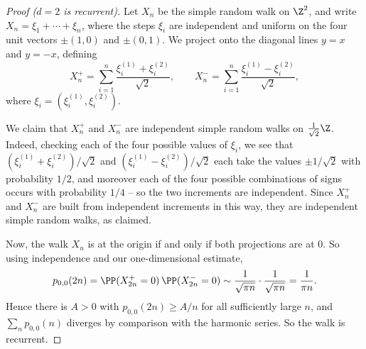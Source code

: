 \documentclass[a4paper]{scrartcl}
\begin{document}
\begin{center}
\end{center}

\begin{proof}[Proof ($d = 2$ is recurrent)]
	Let $X_n$ be the simple random walk on $\Z^2$, and write $X_n = \xi_1 + \cdots + \xi_n$, where the steps $\xi_i$ are independent and uniform on the four unit vectors $\pm(1, 0)$ and $\pm(0, 1)$. We project onto the diagonal lines $y = x$ and $y = -x$, defining
	$$
	X_n^+ = \sum_{i = 1}^{n} \frac{\xi_i^{(1)} + \xi_i^{(2)}}{\sqrt{2}}, \qquad X_n^- = \sum_{i = 1}^{n} \frac{\xi_i^{(1)} - \xi_i^{(2)}}{\sqrt{2}},
	$$
	where $\xi_i = (\xi_i^{(1)}, \xi_i^{(2)})$.

	We claim that $X_n^+$ and $X_n^-$ are independent simple random walks on $\frac{1}{\sqrt{2}}\Z$. Indeed, checking each of the four possible values of $\xi_i$, we see that $(\xi_i^{(1)} + \xi_i^{(2)})/\sqrt{2}$ and $(\xi_i^{(1)} - \xi_i^{(2)})/\sqrt{2}$ each take the values $\pm 1/\sqrt{2}$ with probability $1/2$, and moreover each of the four possible combinations of signs occurs with probability $1/4$ -- so the two increments are independent. Since $X_n^+$ and $X_n^-$ are built from independent increments in this way, they are independent simple random walks, as claimed.

	Now, the walk $X_n$ is at the origin if and only if both projections are at 0. So using independence and our one-dimensional estimate,
	$$
	p_{0, 0}(2n) = \PP(X_{2n}^+ = 0)\,\PP(X_{2n}^- = 0) \sim \frac{1}{\sqrt{\pi n}} \cdot \frac{1}{\sqrt{\pi n}} = \frac{1}{\pi n}.
	$$
	Hence there is $A > 0$ with $p_{0, 0}(2n) \geq A/n$ for all sufficiently large $n$, and $\sum_n p_{0, 0}(n)$ diverges by comparison with the harmonic series. So the walk is recurrent.
\end{proof}
\end{document}
